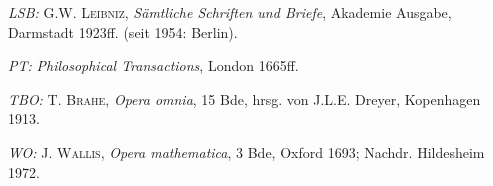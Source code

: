 %
\noindent\hangindent=10mm\textit{LSB:} G.W. \textsc{Leibniz}, \textit{S\"{a}mtliche Schriften und Briefe}, Akademie Ausgabe, Darmstadt 1923ff. (seit 1954: Berlin).\par
%
%
\noindent\hangindent=10mm\textit{PT:} \textit{Philosophical Transactions}, London 1665ff.\par
%
%
\noindent\hangindent=10mm\textit{TBO:} T. \textsc{Brahe}, \textit{%
Opera omnia}, 15 Bde, hrsg. von J.L.E. Dreyer, Kopenhagen 1913.\par
%
%
\noindent\hangindent=10mm\textit{WO:} J. \textsc{Wallis}, \textit{Opera mathematica}, 3 Bde, Oxford 1693; Nachdr. Hildesheim 1972.\par
%
\vspace{6.0ex}

